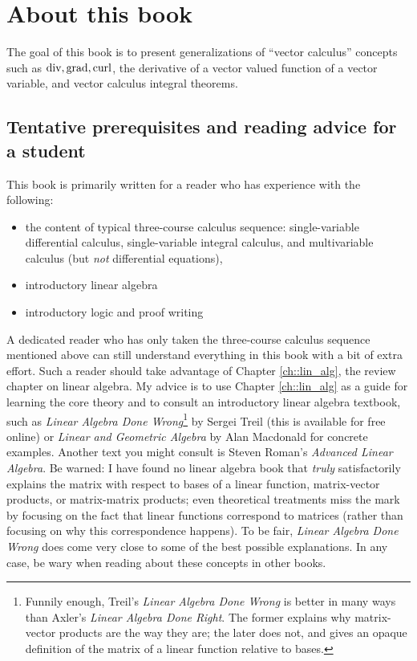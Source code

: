 \chapter*{About this book}

The goal of this book is to present generalizations of ``vector calculus'' concepts such as $\text{div}, \text{grad}, \text{curl}$, the derivative of a vector valued function of a vector variable, and vector calculus integral theorems.

\section*{Tentative prerequisites and reading advice for a student}

This book is primarily written for a reader who has experience with the following:

\begin{itemize}
    \item the content of typical three-course calculus sequence: single-variable differential calculus, single-variable integral calculus, and multivariable calculus (but \textit{not} differential equations),
    \item introductory linear algebra
    \item introductory logic and proof writing
\end{itemize}

A dedicated reader who has only taken the three-course calculus sequence mentioned above can still understand everything in this book with a bit of extra effort. Such a reader should take advantage of Chapter \ref{ch::lin_alg}, the review chapter on linear algebra. My advice is to use Chapter \ref{ch::lin_alg} as a guide for learning the core theory and to consult an introductory linear algebra textbook, such as \textit{Linear Algebra Done Wrong}\footnote{Funnily enough, Treil's \textit{Linear Algebra Done Wrong} is better in many ways than Axler's \textit{Linear Algebra Done Right}. The former explains why matrix-vector products are the way they are; the later does not, and gives an opaque definition of the matrix of a linear function relative to bases.} by Sergei Treil (this is available for free online) or \textit{Linear and Geometric Algebra} by Alan Macdonald for concrete examples. Another text you might consult is Steven Roman's \textit{Advanced Linear Algebra}. Be warned: I have found no linear algebra book that \textit{truly} satisfactorily explains the matrix with respect to bases of a linear function, matrix-vector products, or matrix-matrix products; even theoretical treatments miss the mark by focusing on the fact that linear functions correspond to matrices (rather than focusing on why this correspondence happens). To be fair, \textit{Linear Algebra Done Wrong} does come very close to some of the best possible explanations. In any case, be wary when reading about these concepts in other books.

